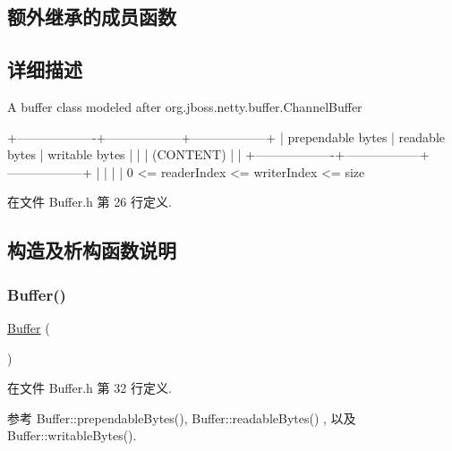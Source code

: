 \subsection*{额外继承的成员函数}


\subsection{详细描述}
A buffer class modeled after org.\+jboss.\+netty.\+buffer.\+Channel\+Buffer


\begin{DoxyCode}
+-------------------+------------------+------------------+
| prependable bytes |  readable bytes  |  writable bytes  |
|                   |     (CONTENT)    |                  |
+-------------------+------------------+------------------+
|                   |                  |                  |
0      <=      readerIndex   <=   writerIndex    <=     size
\end{DoxyCode}
 

在文件 Buffer.\+h 第 26 行定义.



\subsection{构造及析构函数说明}
\mbox{\label{classmuduo_1_1Buffer_a47587d18a394fb4b9508c61e3d5f0260}} 
\subsubsection{\texorpdfstring{Buffer()}{Buffer()}}
{\footnotesize\ttfamily \hyperlink{classmuduo_1_1Buffer}{Buffer} (\begin{DoxyParamCaption}{ }\end{DoxyParamCaption})\hspace{0.3cm}{\ttfamily [inline]}}



在文件 Buffer.\+h 第 32 行定义.



参考 Buffer\+::prependable\+Bytes(), Buffer\+::readable\+Bytes() , 以及 Buffer\+::writable\+Bytes().


